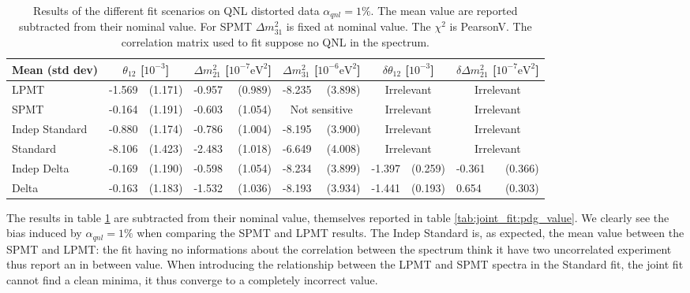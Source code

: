 \documentclass[../main.tex]{subfiles}
\begin{document}
\begin{table}[h]
  \begin{footnotesize}
  \centering
  \begin{tabular}{l|lr|lr|lr|lr|lr|}
    Mean (std dev)  & \multicolumn{2}{c|}{$\theta_{12}$ [$10^{-3}$]} & \multicolumn{2}{c|}{$\Delta m^2_{21}$ [$10^{-7}\mathrm{eV}^{2}$]} & \multicolumn{2}{c|}{$\Delta m^2_{31}$ [$10^{-6}\mathrm{eV}^{2}$]} & \multicolumn{2}{c|}{$\delta \theta_{12}$ [$10^{-3}$]} & \multicolumn{2}{c|}{$\delta \Delta m^2_{21}$ [$10^{-7}\mathrm{eV}^{2}$]} \\
    \hline
    LPMT            & -1.569 & (1.171) & -0.957 & (0.989) & -8.235 & (3.898)       & \multicolumn{2}{c|}{Irrelevant} & \multicolumn{2}{c|}{Irrelevant}  \\
    SPMT            & -0.164 & (1.191) & -0.603 & (1.054) & \multicolumn{2}{c|}{Not sensitive} &\multicolumn{2}{c|}{Irrelevant} & \multicolumn{2}{c|}{Irrelevant}  \\
    Indep Standard  & -0.880 & (1.174) & -0.786 & (1.004) & -8.195 & (3.900)       & \multicolumn{2}{c|}{Irrelevant} & \multicolumn{2}{c|}{Irrelevant}  \\
    Standard        & -8.106 & (1.423) & -2.483 & (1.018) & -6.649 & (4.008)       & \multicolumn{2}{c|}{Irrelevant} & \multicolumn{2}{c|}{Irrelevant}  \\
    Indep Delta     & -0.169 & (1.190) & -0.598 & (1.054) & -8.234 & (3.899)       & -1.397 & (0.259)     & -0.361 & (0.366) \\
    Delta           & -0.163 & (1.183) & -1.532 & (1.036) & -8.193 & (3.934)       & -1.441 & (0.193)     & 0.654  & (0.303) \\
  \end{tabular}
  \end{footnotesize}
  \caption{Results of the different fit scenarios on QNL distorted data $\alpha_{qnl} = 1\%$. The mean value are reported subtracted from their nominal value. For SPMT $\Delta m^2_{31}$ is fixed at nominal value. The $\chi^2$ is PearsonV. The correlation matrix used to fit suppose no QNL in the spectrum.}
  \label{tab:joint_fit:qnl_results}
\end{table}

The results in table \ref{tab:joint_fit:qnl_results} are subtracted from their nominal value, themselves reported in table \ref{tab:joint_fit:pdg_value}. We clearly see the bias induced by $\alpha_{qnl} = 1\%$ when comparing the SPMT and LPMT results. The Indep Standard is, as expected, the mean value between the SPMT and LPMT: the fit having no informations about the correlation between the spectrum think it have two uncorrelated experiment thus report an in between value. When introducing the relationship between the LPMT and SPMT spectra in the Standard fit, the joint fit cannot find a clean minima, it thus converge to a completely incorrect value.
\end{document}
